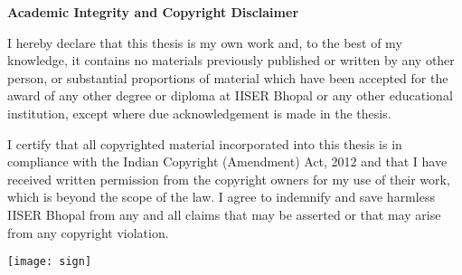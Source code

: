 

\begin{center}
{\textbf{\Large{Academic Integrity and Copyright Disclaimer}}}
 \end{center}
I hereby declare that this thesis is my own work and, to the best of
my knowledge, it contains no materials previously published or written
by any other person, or substantial proportions of material which have
been accepted for the award of any other degree or diploma at IISER
Bhopal or any other educational institution, except where due
acknowledgement is made in the thesis.


\noindent I certify that all copyrighted material incorporated into this thesis is in compliance with the Indian Copyright (Amendment) Act, 2012 and that I have received written permission from the copyright owners for my use of their work, which is beyond the scope of the law. I agree to indemnify and save harmless IISER Bhopal from any and all claims that may be asserted or that may arise from any copyright violation.

\vspace{2cm}
\parbox{0.7\textwidth}{ 
}
\hfill 
\parbox{0.3\textwidth}{ 
	\texttt{[image: sign]}
\mbox{\studentname}
}